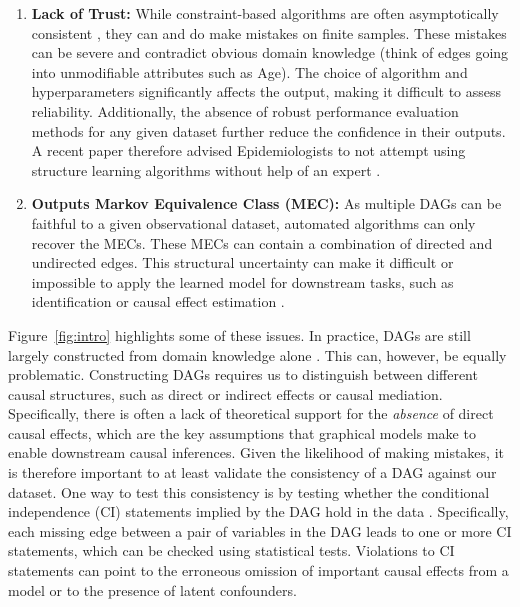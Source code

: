 \documentclass[accepted]{uai2025} %
\begin{document}
\begin{enumerate}
	\item \textbf{Lack of Trust:} While constraint-based algorithms are 
		often asymptotically
		consistent \citep{KalischB07}, they can and do make mistakes
		on  finite samples. These mistakes can be severe and contradict
		obvious domain knowledge (think of edges going into unmodifiable
		attributes such as Age). The choice of algorithm and hyperparameters
		significantly affects the output, making it
		difficult to assess reliability. Additionally, the absence of
		robust performance evaluation methods for any given dataset
		further reduce the confidence in their outputs. A recent paper
		therefore advised Epidemiologists to not attempt using structure
		learning algorithms without help of an expert \citep{Gururaghavendran_2024}.
	\item \textbf{Outputs Markov Equivalence Class (MEC):} As multiple
		DAGs can be faithful to a given observational dataset, automated 
		algorithms can only recover the MECs. These MECs can contain a
		combination of directed and undirected edges. This structural uncertainty
		can make it difficult or impossible to apply the learned model for downstream
		tasks, such as identification or causal
		effect estimation \citep{Maathuis_2009,PerkovicTKM17}.
\end{enumerate}

Figure~\ref{fig:intro} highlights some of these issues. In practice, DAGs 
are still largely constructed from domain knowledge alone 
\citep{Tennant2020,Petersen2021}. This can, however, be equally problematic.
Constructing DAGs requires us to distinguish between different causal structures, 
such as direct or indirect effects or causal mediation. Specifically, there is often a lack
of theoretical support for the \emph{absence} of direct causal effects, which are 
the key assumptions that graphical models make to enable downstream causal inferences.
Given the likelihood of making mistakes, it is therefore
important to at least validate the consistency of a DAG against our dataset. One way to
test this consistency is by testing whether the conditional independence 
(CI) statements implied by the DAG hold in the data \citep{Ankan2021}. Specifically, 
each missing edge between
a pair of variables in the DAG leads to one or more CI statements, 
which can be checked using statistical tests. Violations to CI
statements can point to the erroneous omission of important causal effects from a model
or to the presence of latent confounders.
\end{document}
